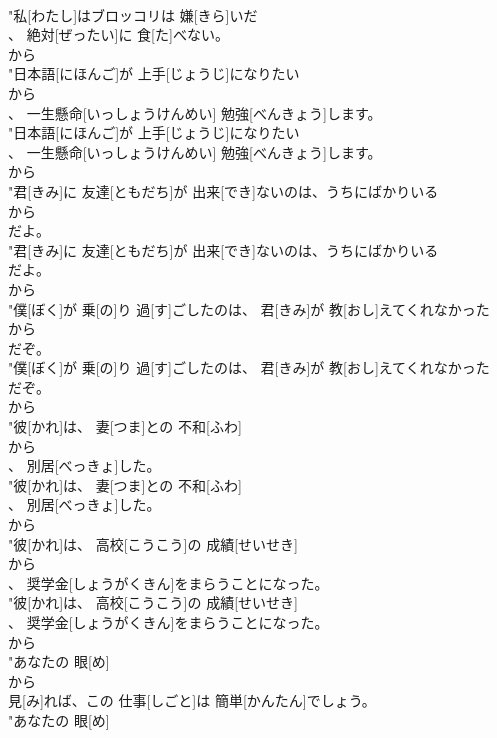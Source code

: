 \documentclass[8pt]{extreport}
\begin{document}
\begin{CJK}{UTF8}{min}
\\	"私[わたし]はブロッコリは 嫌[きら]いだ
\\	、 絶対[ぜったい]に 食[た]べない。
\\	から
\\	"日本語[にほんご]が 上手[じょうじ]になりたい
\\	から
\\	、 一生懸命[いっしょうけんめい] 勉強[べんきょう]します。
\\	"日本語[にほんご]が 上手[じょうじ]になりたい
\\	、 一生懸命[いっしょうけんめい] 勉強[べんきょう]します。
\\	から
\\	"君[きみ]に 友達[ともだち]が 出来[でき]ないのは、うちにばかりいる
\\	から
\\	だよ。
\\	"君[きみ]に 友達[ともだち]が 出来[でき]ないのは、うちにばかりいる
\\	だよ。
\\	から
\\	"僕[ぼく]が 乗[の]り 過[す]ごしたのは、 君[きみ]が 教[おし]えてくれなかった
\\	から
\\	だぞ。
\\	"僕[ぼく]が 乗[の]り 過[す]ごしたのは、 君[きみ]が 教[おし]えてくれなかった
\\	だぞ。
\\	から
\\	"彼[かれ]は、 妻[つま]との 不和[ふわ]
\\	から
\\	、 別居[べっきょ]した。
\\	"彼[かれ]は、 妻[つま]との 不和[ふわ]
\\	、 別居[べっきょ]した。
\\	から
\\	"彼[かれ]は、 高校[こうこう]の 成績[せいせき]
\\	から
\\	、 奨学金[しょうがくきん]をまらうことになった。
\\	"彼[かれ]は、 高校[こうこう]の 成績[せいせき]
\\	、 奨学金[しょうがくきん]をまらうことになった。
\\	から
\\	"あなたの 眼[め]
\\	から
\\	見[み]れば、この 仕事[しごと]は 簡単[かんたん]でしょう。
\\	"あなたの 眼[め]

\end{CJK}
\end{document}
